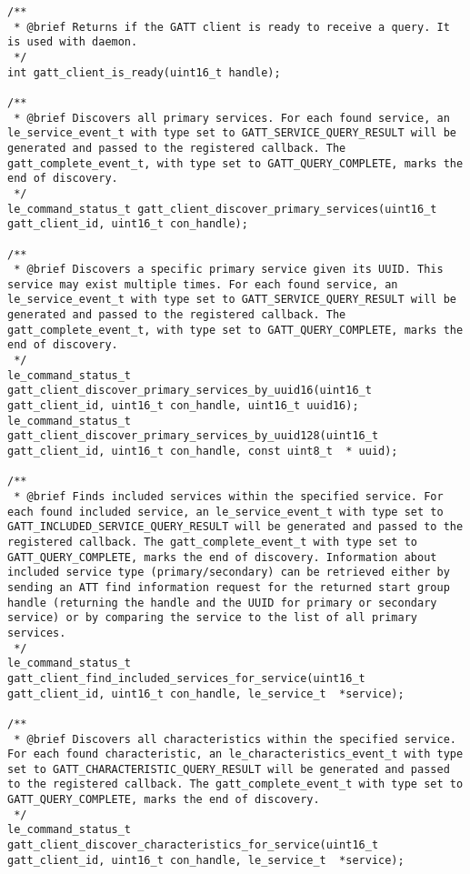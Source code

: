 \begin{lstlisting}
/** 
 * @brief Returns if the GATT client is ready to receive a query. It is used with daemon. 
 */
int gatt_client_is_ready(uint16_t handle);

/** 
 * @brief Discovers all primary services. For each found service, an le_service_event_t with type set to GATT_SERVICE_QUERY_RESULT will be generated and passed to the registered callback. The gatt_complete_event_t, with type set to GATT_QUERY_COMPLETE, marks the end of discovery. 
 */
le_command_status_t gatt_client_discover_primary_services(uint16_t gatt_client_id, uint16_t con_handle);

/** 
 * @brief Discovers a specific primary service given its UUID. This service may exist multiple times. For each found service, an le_service_event_t with type set to GATT_SERVICE_QUERY_RESULT will be generated and passed to the registered callback. The gatt_complete_event_t, with type set to GATT_QUERY_COMPLETE, marks the end of discovery. 
 */
le_command_status_t gatt_client_discover_primary_services_by_uuid16(uint16_t gatt_client_id, uint16_t con_handle, uint16_t uuid16);
le_command_status_t gatt_client_discover_primary_services_by_uuid128(uint16_t gatt_client_id, uint16_t con_handle, const uint8_t  * uuid);

/** 
 * @brief Finds included services within the specified service. For each found included service, an le_service_event_t with type set to GATT_INCLUDED_SERVICE_QUERY_RESULT will be generated and passed to the registered callback. The gatt_complete_event_t with type set to GATT_QUERY_COMPLETE, marks the end of discovery. Information about included service type (primary/secondary) can be retrieved either by sending an ATT find information request for the returned start group handle (returning the handle and the UUID for primary or secondary service) or by comparing the service to the list of all primary services. 
 */
le_command_status_t gatt_client_find_included_services_for_service(uint16_t gatt_client_id, uint16_t con_handle, le_service_t  *service);

/** 
 * @brief Discovers all characteristics within the specified service. For each found characteristic, an le_characteristics_event_t with type set to GATT_CHARACTERISTIC_QUERY_RESULT will be generated and passed to the registered callback. The gatt_complete_event_t with type set to GATT_QUERY_COMPLETE, marks the end of discovery.
 */
le_command_status_t gatt_client_discover_characteristics_for_service(uint16_t gatt_client_id, uint16_t con_handle, le_service_t  *service);


\end{lstlisting}

